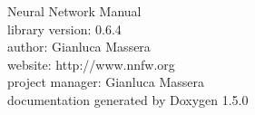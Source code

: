 \documentclass[a4paper]{book}
\begin{document}
\begin{titlepage}
\vspace*{7cm}
\begin{center}
{\Huge Neural Network Manual}\\
\vspace*{1cm}
{\large library version: 0.6.4}\\
{\large author: Gianluca Massera}\\
{\large website: http://www.nnfw.org}\\
{\large project manager: Gianluca Massera}\\
{\large documentation generated by Doxygen 1.5.0}\\
\end{center}
\end{titlepage}
\clearemptydoublepage


\tableofcontents
\clearemptydoublepage










\printindex
\end{document}
